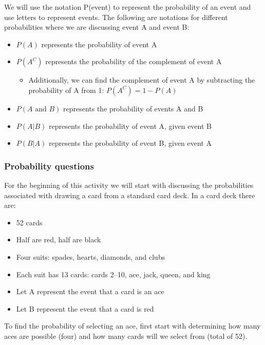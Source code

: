 \documentclass[
]{report}
\providecommand{\tightlist}{%
  \setlength{\itemsep}{0pt}\setlength{\parskip}{0pt}}
\begin{document}
We will use the notation P(event) to represent the probability of an event and use letters to represent events. The following are notations for different probabilities where we are discussing event A and event B:

\begin{itemize}
\item
  \(P(A)\) represents the probability of event A
\item
  \(P(A^C)\) represents the probability of the complement of event A

  \begin{itemize}
  \tightlist
  \item
    Additionally, we can find the complement of event A by subtracting the probability of A from 1: \(P(A^C) = 1 - P(A)\)
  \end{itemize}
\item
  \(P(A \text{ and } B)\) represents the probability of events A and B
\item
  \(P(A|B)\) represents the probability of event A, given event B
\item
  \(P(B|A)\) represents the probability of event B, given event A
\end{itemize}

\subsubsection*{Probability questions}\label{probability-questions}

For the beginning of this activity we will start with discussing the probabilities associated with drawing a card from a standard card deck. In a card deck there are:

\begin{itemize}
\item
  52 cards
\item
  Half are red, half are black
\item
  Four suits: spades, hearts, diamonds, and clubs
\item
  Each suit has 13 cards: cards 2--10, ace, jack, queen, and king
\item
  Let A represent the event that a card is an ace
\item
  Let B represent the event that a card is red
\end{itemize}

To find the probability of selecting an ace, first start with determining how many aces are possible (four) and how many cards will we select from (total of 52).
\end{document}
